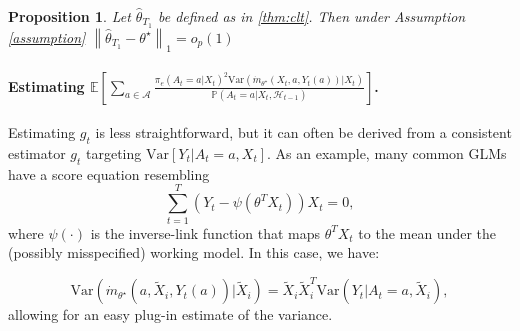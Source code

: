 \documentclass[11pt]{article}
\newcommand{\E}{\mathbb{E}}
\newcommand{\Var}{\mathrm{Var}}
\newcommand{\norm}[1]{\left\lVert#1\right\rVert}
\newtheorem{proposition}{Proposition}
\begin{document}
\begin{proposition}
Let $\hat{\theta}_{T}_{1}$ be defined as in \cref{thm:clt}. Then under Assumption \ref{assumption} $\norm{\hat{\theta}_{T}_{1} - \theta^{\star}}_{1} = o_{p}(1) $
\end{proposition}



\paragraph{Estimating $\E \left[\sum_{a\in \mathcal{A}}\frac{\pi_{e}(A_{t} =a | X_{t})^{2} \Var \left(  \dot{m}_{\theta^{\star}}(X_t,a,Y_{t}(a)) | X_{t} \right)  }{  \mathbb{P} \left(A_{t}=a| X_{t}, \mathcal{H}_{t-1}\right)  } \right]$.}
Estimating $g_{t}$ is less straightforward, but it can often be derived from a consistent estimator $g_{t}$ targeting $\Var[Y_{t} | A_{t} = a, X_{t}]$. As an example, many common GLMs have a score equation resembling 
$$\sum_{t=1}^{T}(Y_{t} - \psi(\theta^{T}X_{t}))X_{t} = 0 ,$$
where $\psi(\cdot)$ is the inverse-link function that maps $\theta^{T}X_{t}$ to the mean under the (possibly misspecified) working model. In this case, we have:

$$\Var \left(  \dot{m}_{{\theta}^{\star}}(a,\tilde{X}_{i},Y_{t}(a)) | \tilde{X}_{i} \right) = \tilde{X}_{i}\tilde{X}_{i}^{T} \Var \left( Y_{t} | A_{t} =a , \tilde{X}_{i}  \right),$$
allowing for an easy plug-in estimate of the variance. 
\fi
\end{document}
